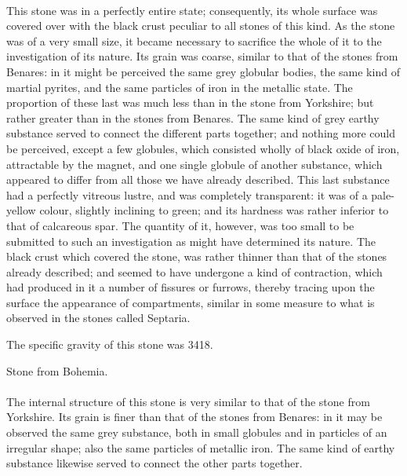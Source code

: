 \documentclass[a4paper, 12pt, oneside, twocolumn]{article}
\begin{document}
\paragraph{}
This stone was in a perfectly entire state; consequently, its whole surface was covered over with the black crust peculiar to all stones of this kind. As the stone was of a very small size, it became necessary to sacrifice the whole of it to the investigation of its nature. Its grain was coarse, similar to that of the stones from Benares: in it might be perceived the same grey globular bodies, the same kind of martial pyrites, and the same particles of iron in the metallic state. The proportion of these last was much less than in the stone from Yorkshire; but rather greater than in the stones from Benares. The same kind of grey earthy substance served to connect the different parts together; and nothing more could be perceived, except a few globules, which consisted wholly of black oxide of iron, attractable by the magnet, and one single globule of another substance, which appeared to differ from all those we have already described. This last substance had a perfectly vitreous lustre, and was completely transparent: it was of a pale-yellow colour, slightly inclining to green; and its hardness was rather inferior to that of calcareous spar. The quantity of it, however, was too small to be submitted to such an investigation as might have determined its nature. The black crust which covered the stone, was rather thinner than that of the stones already described; and seemed to have undergone a kind of contraction, which had produced in it a number of fissures or furrows, thereby tracing upon the surface the appearance of compartments, similar in some measure to what is observed in the stones called Septaria.

The specific gravity of this stone was 3418.
\begin{center}
Stone from Bohemia.
\end{center}
\paragraph{}
The internal structure of this stone is very similar to that of the stone from Yorkshire. Its grain is finer than that of the stones from Benares: in it may be observed the same grey substance, both in small globules and in particles of an irregular shape; also the same particles of metallic iron. The same kind of earthy substance likewise served to connect the other parts together.
\end{document}
